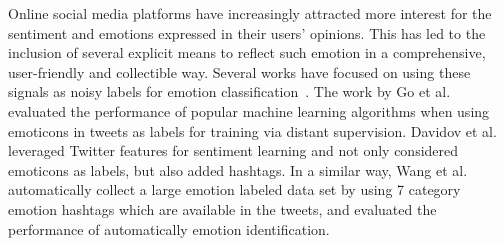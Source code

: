 \documentclass[12pt,a4paper]{report}
\theoremstyle{definition}
\begin{document}
\begin{CJK}{UTF8}{bsmi}
    \par Online social media platforms have increasingly attracted more interest for the sentiment and emotions expressed in their users' opinions. This has led to the inclusion of several explicit means to reflect such emotion in a comprehensive, user-friendly and collectible way. Several works have focused on using these signals as noisy labels for emotion classification~\cite{argueta2016multilingual, davidov2010enhanced, wang2012emotion,tang2013emotion, go2009twitter, hu2013unsupervised, wang2016sentiment, zhao2012moodlens}. The work by Go et al.~\cite{go2009twitter}  evaluated the performance of popular machine learning algorithms when using emoticons in tweets as labels for training via distant supervision. Davidov et al.~\cite{davidov2010enhanced}  leveraged Twitter features for sentiment learning and not only considered emoticons as labels, but also added hashtags. In a similar way, Wang et al.~\cite{wang2012emotion} automatically collect a large emotion labeled data set by using 7 category emotion hashtags which are available in the tweets, and evaluated the performance of automatically emotion identification.
    

\end{CJK}
\end{document}
